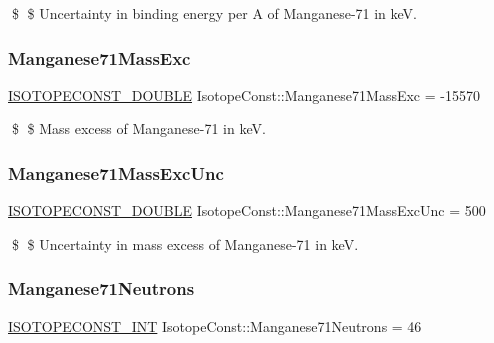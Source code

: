 \$ \$ Uncertainty in binding energy per A of Manganese-\/71 in keV. \mbox{\label{group___isotope_const-_manganese-_mn71_ga3ee9961676fcf4b64555e0442b4a0176}} 
\subsubsection{\texorpdfstring{Manganese71\+Mass\+Exc}{Manganese71MassExc}}
{\footnotesize\ttfamily \mbox{\hyperlink{group___isotope_const-_macros_ga8f45a7272ce02c0b4c65c44636ed719a}{I\+S\+O\+T\+O\+P\+E\+C\+O\+N\+S\+T\+\_\+\+D\+O\+U\+B\+LE}} Isotope\+Const\+::\+Manganese71\+Mass\+Exc = -\/15570}

\$ \$ Mass excess of Manganese-\/71 in keV. \mbox{\label{group___isotope_const-_manganese-_mn71_ga62d044cb2a8ac5a752b03e694faf4313}} 
\subsubsection{\texorpdfstring{Manganese71\+Mass\+Exc\+Unc}{Manganese71MassExcUnc}}
{\footnotesize\ttfamily \mbox{\hyperlink{group___isotope_const-_macros_ga8f45a7272ce02c0b4c65c44636ed719a}{I\+S\+O\+T\+O\+P\+E\+C\+O\+N\+S\+T\+\_\+\+D\+O\+U\+B\+LE}} Isotope\+Const\+::\+Manganese71\+Mass\+Exc\+Unc = 500}

\$ \$ Uncertainty in mass excess of Manganese-\/71 in keV. \mbox{\label{group___isotope_const-_manganese-_mn71_ga5d733b5342071d9d266c98a456740255}} 
\subsubsection{\texorpdfstring{Manganese71\+Neutrons}{Manganese71Neutrons}}
{\footnotesize\ttfamily \mbox{\hyperlink{group___isotope_const-_macros_ga5f18360b3e99483a35c32d789e62621c}{I\+S\+O\+T\+O\+P\+E\+C\+O\+N\+S\+T\+\_\+\+I\+NT}} Isotope\+Const\+::\+Manganese71\+Neutrons = 46}

